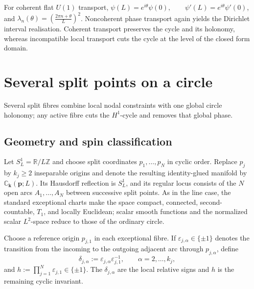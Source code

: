 \documentclass[11pt]{article}
\theoremstyle{plain}
\theoremstyle{definition}
\begin{document}
For coherent flat \(U(1)\) transport,
\(\psi(L)=e^{i\theta}\psi(0), \qquad \psi'(L)=e^{i\theta}\psi'(0)\),
and
\(\lambda_n(\theta) = \left( \frac{2\pi n+\theta}{L} \right)^2\).
Noncoherent phase transport again yields the Dirichlet interval
realisation. Coherent transport preserves the cycle and its holonomy,
whereas incompatible local transport cuts the cycle at the level of the
closed form domain.

\section{Several split points on a circle}
\label{sec:multisplit-circle}

Several split fibres combine local nodal constraints with one global circle holonomy; any active fibre cuts the \(H^1\)-cycle and removes that global phase.

\subsection{Geometry and spin classification}
\label{subsec:multisplit-circle-spin-data}

Let \(S^1_L=\mathbb R/L\mathbb Z\) and choose split coordinates \(p_1,\ldots,p_N\) in cyclic order. Replace \(p_j\) by \(k_j\geq2\) inseparable origins and
denote the resulting identity-glued manifold by
\(\mathbb C_{\mathbf k}(\mathbf p;L)\).
Its Hausdorff reflection is \(S^1_L\), and its regular locus consists of the
\(N\) open arcs \(A_1,\ldots,A_N\) between successive split points. As in the line case, the standard
exceptional charts make the space compact, connected, second-countable,
\(T_1\), and locally Euclidean; scalar smooth functions and the normalized
scalar \(L^2\)-space reduce to those of the ordinary circle.

Choose a reference origin \(p_{j,1}\) in each exceptional fibre. If
\(\varepsilon_{j,\alpha}\in\{\pm1\}\) denotes the transition from the
incoming to the outgoing adjacent arc through \(p_{j,\alpha}\), define
\[
  \delta_{j,\alpha}
  :=
  \varepsilon_{j,\alpha}
  \varepsilon_{j,1}^{-1},
  \qquad
  \alpha=2,\ldots,k_j,
\]
and
\(h := \prod_{j=1}^{N} \varepsilon_{j,1} \in\{\pm1\}\).
The \(\delta_{j,\alpha}\) are the local relative signs and \(h\) is the
remaining cyclic invariant.
\end{document}
